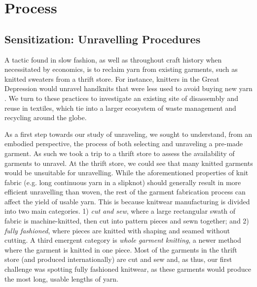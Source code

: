 \documentclass{sigchi}
\begin{document}
\section{Process}

\subsection*{Sensitization: Unravelling Procedures}
A tactic found in slow fashion, as well as throughout craft history when necessitated by economics, is to reclaim yarn from existing garments, such as knitted sweaters from a thrift store. For instance, knitters in the Great Depression would unravel handknits that were less used to avoid buying new yarn \cite{black_knitting:_2012}. We turn to these practices to investigate an existing site of disassembly and reuse in textiles, which tie into a larger ecosystem of waste management and recycling around the globe.

As a first step towards our study of unraveling, we sought to understand, from an embodied perspective, the process of both selecting and unraveling a pre-made garment. As such we took a trip to a thrift store to assess the availability of garments to unravel. At the thrift store, we could see that many knitted garments would be unsuitable for unravelling. While the aforementioned properties of knit fabric (e.g. long continuous yarn in a slipknot) should generally result in more efficient unravelling than woven, the rest of the garment fabrication process can affect the yield of usable yarn. This is because knitwear manufacturing is divided into two main categories. 1) \emph{cut and sew}, where a large rectangular swath of fabric is machine-knitted, then cut into pattern pieces and sewn together; and 2) \emph{fully fashioned}, where pieces are knitted with shaping and seamed without cutting. A third emergent category is \emph{whole garment knitting}, a newer method where the garment is knitted in one piece.  Most of the garments in the thrift store (and produced internationally) are cut and sew and, as thus, our first challenge was spotting fully fashioned knitwear, as these garments would produce the most long, usable lengths of yarn. 
\end{document}
